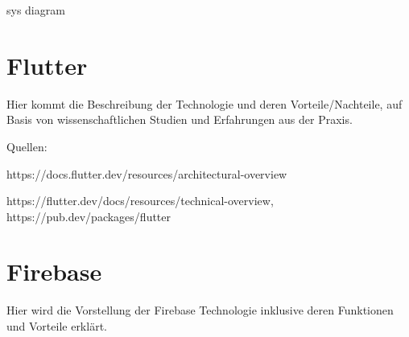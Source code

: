 

sys diagram




\section{Flutter}

Hier kommt die Beschreibung der Technologie und deren Vorteile/Nachteile, auf Basis von wissenschaftlichen Studien und Erfahrungen aus der Praxis.

Quellen:

https://docs.flutter.dev/resources/architectural-overview

https://flutter.dev/docs/resources/technical-overview,
https://pub.dev/packages/flutter







\section{Firebase}
\author{Martin Hausleitner}


Hier wird die Vorstellung der Firebase Technologie inklusive deren Funktionen und Vorteile erklärt.

